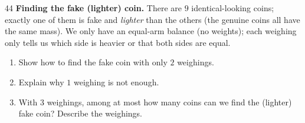 \begin{probbox}{44}{}
\textbf{Finding the fake (lighter) coin.} There are $9$ identical-looking coins; exactly one of them is fake and \emph{lighter} than the
others (the genuine coins all have the same mass). We only have an equal-arm balance (no weights); each weighing only tells us which
side is heavier or that both sides are equal.
\begin{enumerate}[label=\alph*),leftmargin=1.6em,itemsep=1pt,topsep=2pt]
  \item Show how to find the fake coin with only $2$ weighings.
  \item Explain why $1$ weighing is not enough.
  \item With $3$ weighings, among at most how many coins can we find the (lighter) fake coin? Describe the weighings.
\end{enumerate}
\end{probbox}
